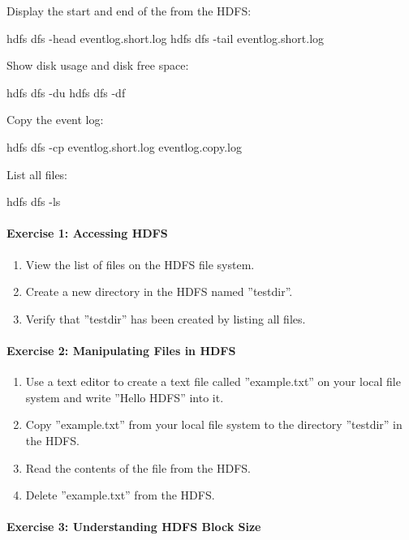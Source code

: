\begin{withcode}
Display the start and end of the from the HDFS:
\begin{bashcode}
hdfs dfs -head eventlog.short.log
hdfs dfs -tail eventlog.short.log
\end{bashcode}

Show disk usage and disk free space:
\begin{bashcode}
hdfs dfs -du
hdfs dfs -df
\end{bashcode}

Copy the event log:
\begin{bashcode}
hdfs dfs -cp eventlog.short.log eventlog.copy.log
\end{bashcode}

List all files:
\begin{bashcode}
hdfs dfs -ls
\end{bashcode}


\begin{exerciseboxcomputer}
\paragraph*{Exercise 1: Accessing HDFS}

\begin{enumerate}
  \item View the list of files on the HDFS file system.
  \item Create a new directory in the HDFS named ''testdir''.
  \item Verify that ''testdir'' has been created by listing all files.
\end{enumerate}

\paragraph*{Exercise 2: Manipulating Files in HDFS}

\begin{enumerate}
  \item Use a text editor to create a text file called ''example.txt'' on your local file system and write ''Hello HDFS'' into it.
  \item Copy ''example.txt'' from your local file system to the directory ''testdir'' in the HDFS.
  \item Read the contents of the file from the HDFS.
  \item Delete ''example.txt'' from the HDFS.
\end{enumerate}

\paragraph*{Exercise 3: Understanding HDFS Block Size}


\end{exerciseboxcomputer}
\end{withcode}
